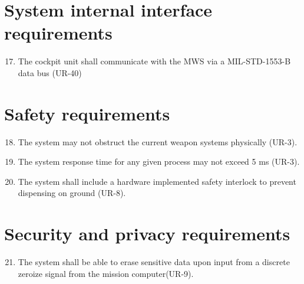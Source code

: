 \documentclass[Main]{subfiles}
\begin{document}
\section{System internal interface requirements}

\begin{enumerate}[{SR}-1]
\setcounter{enumi}{16}
\item The cockpit unit shall communicate with the MWS via a MIL-STD-1553-B data bus (UR-40)\label{SR-17}

\end{enumerate}


\section{Safety requirements}
\begin{enumerate}[{SR}-1.]
\setcounter{enumi}{17}
\item The system may not obstruct the current weapon systems physically (UR-3).\label{SR-18}

\item The system response time for any given process may not exceed 5 ms (UR-3).\label{SR-19}

\item The system shall include a hardware implemented safety interlock to prevent dispensing on ground (UR-8).\label{SR-20}

\end{enumerate}


\section{Security and privacy requirements}

\begin{enumerate}[{SR}-1]
\setcounter{enumi}{20}
\item The system shall be able to erase sensitive data upon input from a discrete zeroize signal from the mission computer(UR-9).\label{SR-21}

\end{enumerate}
\end{document}
